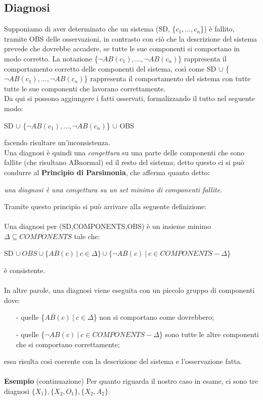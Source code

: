 \documentclass[a4paper,12pt]{report}
\begin{document}
\subsection{Diagnosi}
Supponiamo di aver determinato che un sistema (SD, \{\textit{$c_1,\dots,c_n$}\}) è fallito, tramite OBS delle osservazioni, in contrasto con ciò che la descrizione del sistema prevede che dovrebbe accadere, se tutte le sue componenti si comportano in modo corretto. La notazione \{$\neg{AB(c_1)},\dots,\neg{AB(c_n)}$\} rappresenta il comportamento corretto delle componenti del sistema, così come SD $\cup$  \{$\neg{AB(c_1)},...,\neg{AB(c_n)}$\} rappresenta il comportamento del sistema con tutte tutte le sue componenti che lavorano correttamente.\\
Da qui si possono aggiungere i fatti osservati, formalizzando il tutto nel seguente modo:
\begin{center}
SD $\cup$ \{$\neg{AB(c_1)},\dots,\neg{AB(c_n)}$\} $\cup$ OBS
\end{center}
facendo risultare un'inconsistenza.\\
Una diagnosi è quindi una \textit{congettura} su una parte delle componenti che sono fallite (che risultano ABnormal) ed il resto del sistema; detto questo ci si può condurre al \textbf{Principio di Parsimonia}, che afferma quanto detto:
\begin{center}
    \textit{una diagnosi è una congettura su un set minimo di componenti fallite.}
\end{center}
\newpage
Tramite questo principio si può arrivare alla seguente definizione:\\
\\Una diagnosi per (SD,COMPONENTS,OBS) è un insieme minimo\\$\Delta \subseteq COMPONENTS$ tale che:
\begin{center}
SD $\cup\ OBS \cup \{AB(c)\ |\ c \in \Delta\} \cup \{\neg AB(c)\ |\ c \in COMPONENTS - \Delta$\}
\end{center}
è consistente.\\
\\In altre parole, una diagnosi viene eseguita con un piccolo gruppo di componenti dove:
\begin{itemize}
    \item[-] quelle \{$AB(c)\ |\ c \in \Delta$\} non si comportano come dovrebbero;
    \item[-] quelle \{$\neg AB(c)\ |\ c \in COMPONENTS - \Delta$\} sono tutte le altre componenti che si comportano correttamente;
\end{itemize}
essa risulta così coerente con la descrizione del sistema e l'osservazione fatta.\\
\\\textbf{Esempio} (continuazione) Per quanto riguarda il nostro caso in esame, ci sono tre diagnosi $\{X_1\}, \{X_2, O_1\}, \{X_2, A_2\}$.
\end{document}

